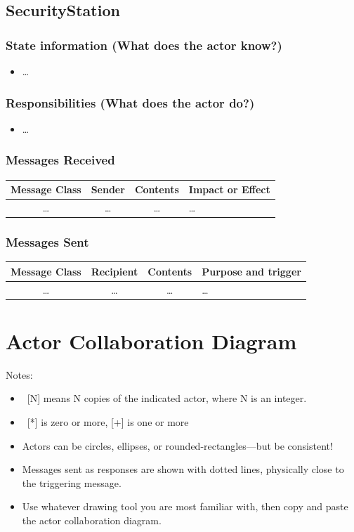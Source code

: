 \documentclass[12pt,letterpaper]{scrartcl}
\begin{document}
\subsection*{SecurityStation}
\subsubsection*{State information (What does the actor know?)}
\begin{itemize}
\item \dots
\end{itemize}

\subsubsection*{Responsibilities (What does the actor do?)}
\begin{itemize}
\item \dots
\end{itemize}

\subsubsection*{Messages Received}
\begin{center}
\begin{tabulary}{\textwidth}{|c|c|c|L|}
	\hline
	Message Class & Sender & Contents & Impact or Effect \\ \hline
	\dots & \dots & \dots & \dots \\
	\hline
\end{tabulary}
\end{center}

\subsubsection*{Messages Sent}
\begin{center}
\begin{tabulary}{\textwidth}{|c|c|c|L|}
	\hline
	Message Class & Recipient & Contents & Purpose and trigger \\
	\hline
	\dots & \dots & \dots & \dots \\
	\hline
\end{tabulary}
\end{center}

\section{Actor Collaboration Diagram}
Notes:
\begin{itemize}
\item\ [N] means N copies of the indicated actor, where N is an integer.
\item\ [*] is zero or more, [+] is one or more
\item Actors can be circles, ellipses, or rounded-rectangles---but be consistent!
\item Messages sent as responses are shown with dotted lines, physically close to the triggering message.
\item Use whatever drawing tool you are most familiar with, then copy and paste the actor collaboration diagram.
\end{itemize}
\end{document}
